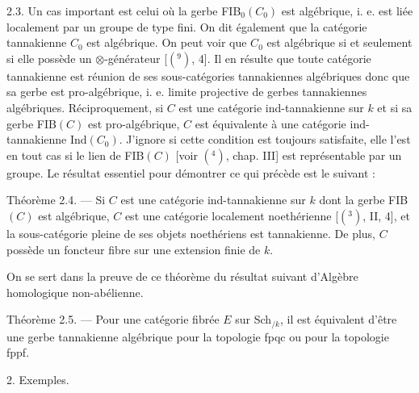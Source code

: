 
2.3. Un cas important est celui où la gerbe FIB$_0(C_0)$ est algébrique,
i. e. est liée localement par un groupe de type fini. On dit également que la
catégorie tannakienne $C_0$ est algébrique. On peut voir que $C_0$ est algébrique
si et seulement si elle possède un $\otimes$-générateur [$(^9)$, 4]. Il en résulte que
toute catégorie tannakienne est réunion de ses sous-catégories tannakiennes
algébriques donc que sa gerbe est pro-algébrique, i. e. limite projective de
gerbes tannakiennes algébriques. Réciproquement, si $C$ est une catégorie
ind-tannakienne sur $k$ et si sa gerbe FIB$(C)$ est pro-algébrique, $C$ est
équivalente à une catégorie ind-tannakienne Ind$(C_0)$. J'ignore si cette
condition est toujours satisfaite, elle l'est en tout cas si le lien de FIB$(C)$
[voir $(^4)$, chap. III] est représentable par un groupe. Le résultat essentiel
pour démontrer ce qui précède est le suivant :

Théorème 2.4. --- Si $C$ est une catégorie ind-tannakienne sur $k$ dont la
gerbe FIB$(C)$ est algébrique, $C$ est une catégorie localement noethérienne [$(^3)$,
II, 4], et la sous-catégorie pleine de ses objets noethériens est tannakienne.
De plus, $C$ possède un foncteur fibre sur une extension finie de $k$.

On se sert dans la preuve de ce théorème du résultat suivant d'Algèbre
homologique non-abélienne.

Théorème 2.5. --- Pour une catégorie fibrée $E$ sur Sch$_{/k}$, il est équivalent
d'être une gerbe tannakienne algébrique pour la topologie fpqc ou pour la
topologie fppf.

2. Exemples.


